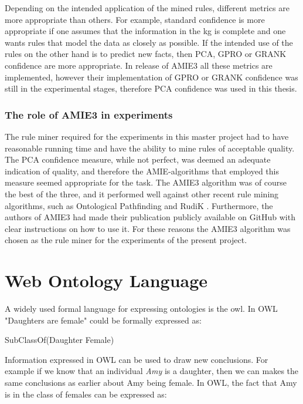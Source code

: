 Depending on the intended application of the mined rules, different metrics are more appropriate than others. For example, standard confidence is more appropriate if one assumes that the information in the \gls{kg} is complete and one wants rules that model the data as closely as possible. If the intended use of the rules on the other hand is to predict new facts, then PCA, GPRO or GRANK confidence are more appropriate. In release of AMIE3 all these metrics are implemented, however their implementation of GPRO or GRANK confidence was still in the experimental stages, therefore PCA confidence was used in this thesis.


\subsubsection{The role of AMIE3 in experiments}
The rule miner required for the experiments in this master project had to have reasonable running time and have the ability to mine rules of acceptable quality. The PCA confidence measure, while not perfect, was deemed an adequate indication of quality, and therefore the AMIE-algorithms that employed this measure seemed appropriate for the task. The AMIE3 algorithm was of course the best of the three, and it performed well against other recent rule mining algorithms, such as Ontological Pathfinding \cite{op} and RudiK \cite{rudik}. Furthermore, the authors of AMIE3 had made their publication publicly available on GitHub with clear instructions on how to use it. For these reasons the AMIE3 algorithm was chosen as the rule miner for the experiments of the present project.








\iffalse 
\section{Web Ontology Language}
A widely used formal language for expressing ontologies is the \gls{owl}. In OWL "Daughters are female" could be formally expressed as:

\centerline{\textsf{SubClassOf(Daughter Female)}}
Information expressed in OWL can be used to draw new conclusions. For example if we know that an individual \emph{Amy} is a daughter, then we can makes the same conclusions as earlier about Amy being female. In OWL, the fact that Amy is in the class of females can be expressed as:

